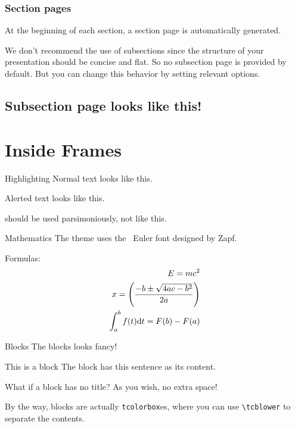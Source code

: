 \documentclass[no-math, aspectratio=1610, 10pt]{beamer}
\begin{document}
    \begin{frame}
        \frametitle{Section pages}
        At the beginning of each section, a section page is automatically generated. 
        
        We don't recommend the use of subsections since the structure of your presentation should be concise and flat. So no subsection page is provided by default. But you can change this behavior by setting relevant options.
    \end{frame}

    \subsection{Subsection page looks like this!}

    \section{Inside Frames}

    \begin{frame}{Highlighting}
        Normal text looks like this.


        \alert{Alerted text looks like this.}

         should be used \alert{parsimoniously}, not like this.
    \end{frame}

    \begin{frame}{Mathematics}
        The theme uses the \AmS\ Euler font designed by Zapf.

        Formulas:
        \begin{align}
            E = mc^2\\
            {x} = \left(\frac{-b \pm \sqrt{4ac - b^2}}{2a}\right)\\
            \int_a^b f(t){\rm d}t = F(b) - F(a)
        \end{align}
    \end{frame}

    \begin{frame}[fragile]{Blocks}
        The blocks looks fancy!

        \begin{block}{This is a block}
            The block has this sentence as its content.
        \end{block}

        \begin{block}{}
            What if a block has no title?
            \tcblower
            As you wish, no extra space! 
            
            By the way, blocks are actually \texttt{tcolorbox}es, where you can use \verb|\tcblower| to separate the contents.
        \end{block}
    \end{frame}
\end{document}
